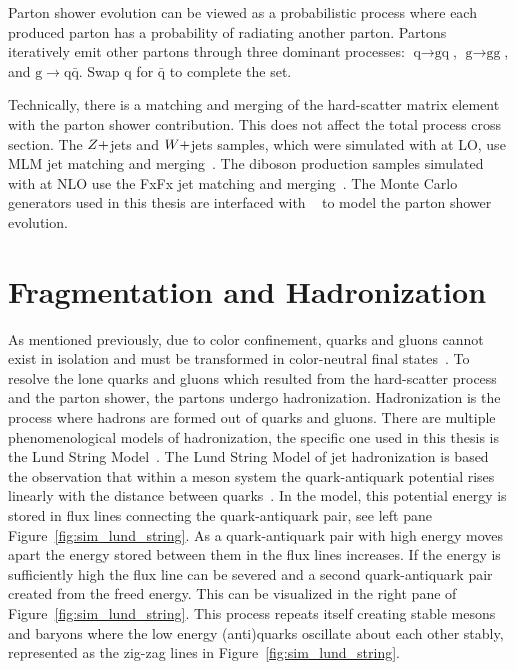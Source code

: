 Parton shower evolution can be viewed as a probabilistic process 
where each produced parton has a probability
of radiating another parton. Partons iteratively emit other partons through three 
dominant processes: $\textrm{q} \to \textrm{gq}$, $\textrm{g} \to \textrm{gg}$, 
and $\textrm{g} \to \textrm{q}\bar{\textrm{q}}$. Swap $\textrm{q}$ for $\bar{\textrm{q}}$
to complete the set. 

Technically, there is a matching and merging of the hard-scatter matrix element with the
parton shower contribution. This does not affect the total process cross section.
The $Z+$jets and $W+$jets samples, which were simulated with \MGAMCNLO at LO, 
use MLM jet matching and merging~\cite{Alwall:2007fs}.
The diboson production samples simulated with \MGAMCNLO at NLO use the 
FxFx jet matching and merging~\cite{Frederix:2012ps}. 
The Monte Carlo generators used in this thesis are interfaced with 
~\cite{Sjostrand:2014zea} to model the parton shower evolution.



\section{Fragmentation and Hadronization}
As mentioned previously, due to color confinement, quarks and gluons cannot exist in isolation
and must be transformed in color-neutral final states~\cite{Hoche:2014rga}. 
To resolve the lone quarks and gluons which resulted from the hard-scatter process and the parton 
shower, the partons undergo hadronization. Hadronization is the process where hadrons are formed 
out of quarks and gluons. There are multiple phenomenological models of hadronization, the
specific one used in this thesis is the Lund String Model~\cite{Sjostrand:1985ys}. 
The Lund String Model of jet
hadronization is based the observation that within a meson system the quark-antiquark 
potential rises linearly with the distance between quarks~\cite{Bali:1992ab}. In the model, this
potential energy is stored in flux lines connecting the quark-antiquark pair, see left pane 
Figure~\ref{fig:sim_lund_string}. As a quark-antiquark 
pair with high energy moves apart the energy stored between them in the flux lines increases. If the energy
is sufficiently high the flux line can be severed and a second quark-antiquark pair created from
the freed energy. This can be visualized in the right pane of Figure~\ref{fig:sim_lund_string}.
This process repeats itself creating stable mesons and baryons where the low energy (anti)quarks
oscillate about each other stably, represented as the zig-zag lines in Figure~\ref{fig:sim_lund_string}.

